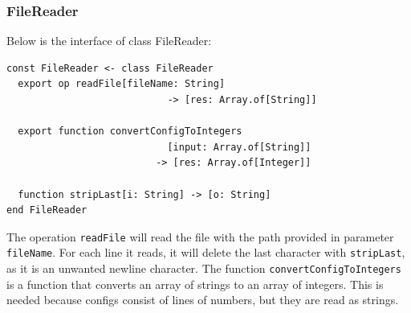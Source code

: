 

\clearpage
\subsubsection{FileReader}
Below is the interface of class FileReader:
\begin{lstlisting}[language=emerald]
const FileReader <- class FileReader
  export op readFile[fileName: String] 
                            -> [res: Array.of[String]]
                            
  export function convertConfigToIntegers
                            [input: Array.of[String]] 
                          -> [res: Array.of[Integer]]
                            
  function stripLast[i: String] -> [o: String]
end FileReader
\end{lstlisting}
The operation \verb|readFile| will read the file with the path provided in parameter \verb|fileName|. For each line it reads, it will delete the last character with \verb|stripLast|, as it is an unwanted newline character. The function \verb|convertConfigToIntegers| is a function that converts an array of strings to an array of integers. This is needed because configs consist of lines of numbers, but they are read as strings.



